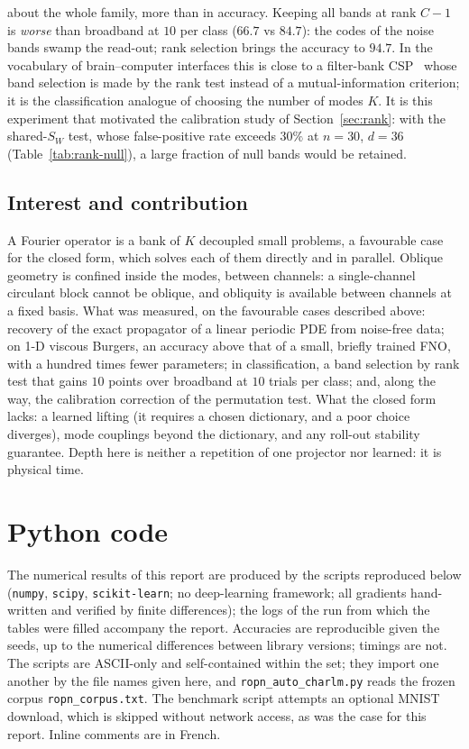 \documentclass[11pt,a4paper]{article}
\theoremstyle{plain}
\theoremstyle{definition}
\theoremstyle{remark}
\begin{document}
about the whole family, more than in accuracy. Keeping all bands at rank $C-1$ is \emph{worse} than
broadband at $10$ per class ($66.7$ vs $84.7$): the codes of the noise bands
swamp the read-out; rank selection brings the accuracy to $94.7$. In the
vocabulary of brain--computer interfaces this is close to a filter-bank
CSP~\cite{ang2008fbcsp} whose band selection is made by the rank test
instead of a mutual-information criterion; it is the classification
analogue of choosing the number of modes $K$. It is this experiment that
motivated the calibration study of Section~\ref{sec:rank}: with the
shared-$S_W$ test, whose false-positive rate exceeds $30\%$ at $n=30$,
$d=36$ (Table~\ref{tab:rank-null}), a large fraction of null bands would be
retained.

\subsection{Interest and contribution}
A Fourier operator is a bank of $K$ decoupled small problems, a favourable
case for the closed form, which solves each of them directly and in
parallel. Oblique geometry is confined inside the modes, between channels:
a single-channel circulant block cannot be oblique, and obliquity is
available between channels at a fixed basis. What was measured, on the
favourable cases described above: recovery of the exact propagator of a
linear periodic PDE from noise-free data; on 1-D viscous Burgers, an
accuracy above that of a small, briefly trained FNO, with a hundred times
fewer parameters; in classification, a band selection by rank test that
gains $10$ points over broadband at $10$ trials per class; and, along the
way, the calibration correction of the permutation test. What the closed
form lacks: a learned lifting (it requires a chosen dictionary, and a poor
choice diverges), mode couplings beyond the dictionary, and any roll-out
stability guarantee. Depth here is neither a repetition of one projector
nor learned: it is physical time.

\section{Python code}
\label{sec:code}
The numerical results of this report are produced by the scripts reproduced
below (\texttt{numpy}, \texttt{scipy}, \texttt{scikit-learn}; no
deep-learning framework; all gradients hand-written and verified by finite
differences); the logs of the run from which the tables were filled
accompany the report. Accuracies are reproducible given the seeds, up to
the numerical differences between library versions; timings are not. The
scripts are ASCII-only and self-contained within the set; they import one
another by the file names given here, and
\texttt{ropn\_auto\_charlm.py} reads the frozen corpus
\texttt{ropn\_corpus.txt}. The benchmark script attempts an optional MNIST
download, which is skipped without network access, as was the case for this
report. Inline comments are in French.
\end{document}
